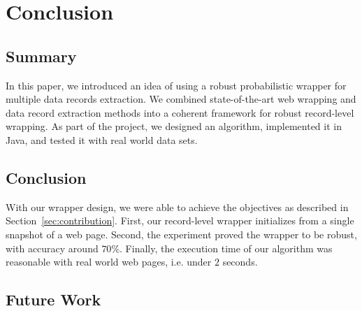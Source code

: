 \chapter{Conclusion}

\section{Summary}

In this paper, we introduced an idea of using a robust probabilistic wrapper for multiple data records extraction. We combined state-of-the-art web wrapping and data record extraction methods into a coherent framework for robust record-level wrapping. As part of the project, we designed an algorithm, implemented it in Java, and tested it with real world data sets.


\section{Conclusion}

With our wrapper design, we were able to achieve the objectives as described in Section~\ref{sec:contribution}. First, our record-level wrapper initializes from a single snapshot of a web page. Second, the experiment proved the wrapper to be robust, with accuracy around $70\%$. Finally, the execution time of our algorithm was reasonable with real world web pages, i.e. under $2$ seconds.



\section{Future Work}

